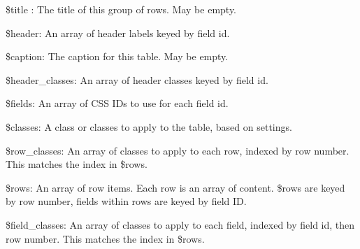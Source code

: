 \begin{DoxyItemize}
\item \$title : The title of this group of rows. May be empty.
\item \$header: An array of header labels keyed by field id.
\item \$caption: The caption for this table. May be empty.
\item \$header\_\-classes: An array of header classes keyed by field id.
\item \$fields: An array of CSS IDs to use for each field id.
\item \$classes: A class or classes to apply to the table, based on settings.
\item \$row\_\-classes: An array of classes to apply to each row, indexed by row number. This matches the index in \$rows.
\item \$rows: An array of row items. Each row is an array of content. \$rows are keyed by row number, fields within rows are keyed by field ID.
\item \$field\_\-classes: An array of classes to apply to each field, indexed by field id, then row number. This matches the index in \$rows. 
\end{DoxyItemize}